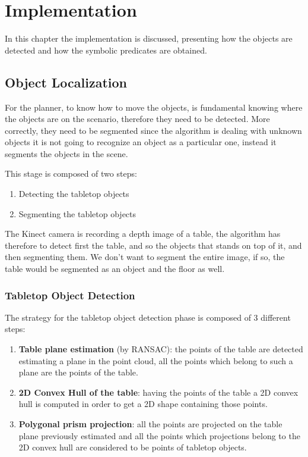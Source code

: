 \chapter{Implementation}
\label{ch:implementation}

In this chapter the implementation is discussed, presenting how the objects are detected and how the symbolic predicates are obtained. 

\section{Object Localization} 
For the planner, to know how to move the objects, is fundamental knowing where the objects are on the scenario, therefore they need to be detected. More correctly, they need to be segmented since the algorithm is dealing with unknown objects it is not going to recognize an object as a particular one, instead it segments the objects in the scene. 

This stage is composed of two steps:
\begin{enumerate}
\item Detecting the tabletop objects
\item Segmenting the tabletop objects
\end{enumerate}
The Kinect camera is recording a depth image of a table, the algorithm has therefore to detect first the table, and so the objects that stands on top of it, and then segmenting them. We don't want to segment the entire image, if so, the table would be segmented as an object and the floor as well.

\subsection{Tabletop Object Detection} 
The strategy for the tabletop object detection phase is composed of 3 different steps:
\begin{enumerate}
\item \textbf{Table plane estimation} (by RANSAC): the points of the table are detected estimating a plane in the point cloud, all the points which belong to such a plane are the points of the table. 
\item \textbf{2D Convex Hull of the table}: having the points of the table a 2D convex hull is computed in order to get a 2D shape containing those points.
\item \textbf{Polygonal prism projection}: all the points are projected on the table plane previously estimated and all the points which projections belong to the 2D convex hull are considered to be points of tabletop objects. 
\end{enumerate}

